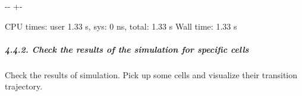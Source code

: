 \documentclass[letterpaper,10pt,english]{sphinxmanual}
\newlength\nbsphinxcodecellspacing
\begin{document}
{

\kern-\sphinxverbatimsmallskipamount\kern-\baselineskip
\kern+\FrameHeightAdjust\kern-\fboxrule
\vspace{\nbsphinxcodecellspacing}

\begin{sphinxVerbatim}[commandchars=\\\{\}]
CPU times: user 1.33 s, sys: 0 ns, total: 1.33 s
Wall time: 1.33 s
\end{sphinxVerbatim}
}


\subparagraph{4.4.2. Check the results of the simulation for specific cells}
\label{\detokenize{notebooks/05_simulation/Gata1_KO_simulation_with_with_Paul_etal_2015_data:4.4.2.-Check-the-results-of-the-simulation-for-specific-cells}}
Check the results of simulation. Pick up some cells and visualize their transition trajectory.
\end{document}
